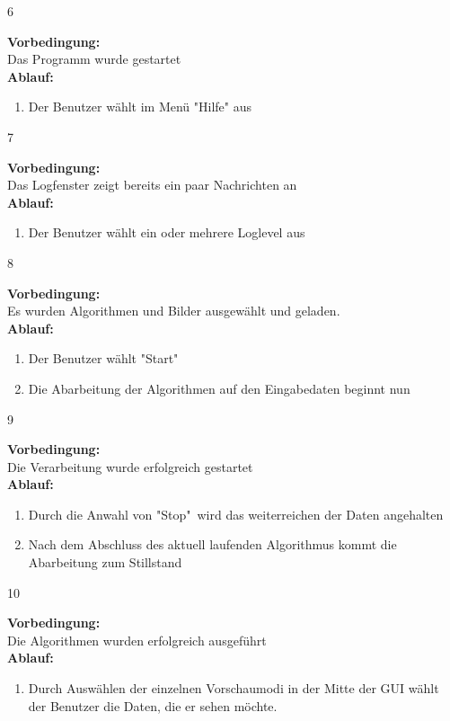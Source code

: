 {{{\begin{enumerate}
			\end{enumerate}
		}
		{6}{
			\textbf{Vorbedingung:}\\
			Das Programm wurde gestartet
			\\\textbf{Ablauf:}
			\begin{enumerate}
				\item Der Benutzer wählt im Menü "{}Hilfe" aus
			\end{enumerate}
		}
		{7}{
			\textbf{Vorbedingung:}\\
			Das Logfenster zeigt bereits ein paar Nachrichten an
			\\\textbf{Ablauf:}
			\begin{enumerate}
				\item Der Benutzer wählt ein oder mehrere Loglevel aus
			\end{enumerate}
		}
		{8}{
			\textbf{Vorbedingung:}\\
			Es wurden Algorithmen und Bilder ausgewählt und geladen.
			\\\textbf{Ablauf:}
			\begin{enumerate}
				\item Der Benutzer wählt "{}Start"
				\item Die Abarbeitung der Algorithmen auf den Eingabedaten beginnt nun
			\end{enumerate}
		}
		{9}{
			\textbf{Vorbedingung:}\\
			Die Verarbeitung wurde erfolgreich gestartet
			\\\textbf{Ablauf:}
			\begin{enumerate}
				\item Durch die Anwahl von "{}Stop" wird das weiterreichen der Daten angehalten
				\item Nach dem Abschluss des aktuell laufenden Algorithmus kommt die Abarbeitung zum Stillstand
			\end{enumerate}
		}
		{10}{
			\textbf{Vorbedingung:}\\
			Die Algorithmen wurden erfolgreich ausgeführt
			\\\textbf{Ablauf:}
			\begin{enumerate}
				\item Durch Auswählen der einzelnen Vorschaumodi in der Mitte der GUI wählt der Benutzer die Daten, die er sehen möchte.
			\end{enumerate}
		}
	}	
}

\newcommand{\fehler}[3]{
\textbf{Fehler: }#1\newline
\textbf{Grund: }#2\newline
\textbf{Behebung: }#3\newline
}
